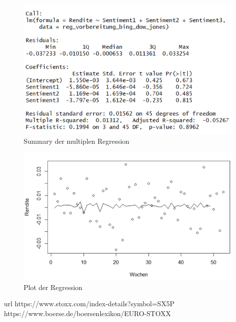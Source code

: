  \begin{figure}[H]
   	\centering
  \includegraphics[width=1\textwidth]{Pictures/ergebnisse_sentiment.png}
   	\caption{Summary der multiplen Regression}
\end{figure}
 \begin{figure}[H]
	\centering
	\includegraphics[width=1\textwidth]{Pictures/Regression_bing_diff.png}
	\caption{Plot der Regression}
\end{figure}


url https://www.stoxx.com/index-details?symbol=SX5P
https://www.boerse.de/boersenlexikon/EURO-STOXX
